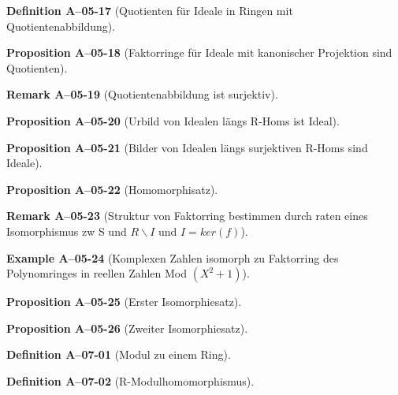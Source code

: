 \documentclass[10pt, letterpaper]{article}
\newcommand{\CustomHeading}[3]{%
  \par\medskip\noindent%
  \textbf{#1 #2} \textnormal{(#3)}.\enskip%
}
\newenvironment{DEF}[2]{\CustomHeading{Definition}{#1}{#2}}{}
\newenvironment{PROP}[2]{\CustomHeading{Proposition}{#1}{#2}}{}
\newenvironment{REM}[2]{\CustomHeading{Remark}{#1}{#2}}{}
\newenvironment{EXA}[2]{\CustomHeading{Example}{#1}{#2}}{}
\begin{document}
\begin{DEF}{A--05-17}{Quotienten für Ideale in Ringen mit Quotientenabbildung}
\end{DEF}

\begin{PROP}{A--05-18}{Faktorringe für Ideale mit kanonischer Projektion sind Quotienten}
\end{PROP}

\begin{REM}{A--05-19}{Quotientenabbildung ist surjektiv}
\end{REM}

\begin{PROP}{A--05-20}{Urbild von Idealen längs R-Homs ist Ideal}
\end{PROP}

\begin{PROP}{A--05-21}{Bilder von Idealen längs surjektiven R-Homs sind Ideale}
\end{PROP}

\begin{PROP}{A--05-22}{Homomorphisatz}
\end{PROP}

\begin{REM}{A--05-23}{Struktur von Faktorring bestimmen durch raten eines Isomorphismus zw S und $R\backslash I$ und $I=ker(f)$}
\end{REM}

\begin{EXA}{A--05-24}{Komplexen Zahlen isomorph zu Faktorring des Polynomringes in reellen Zahlen Mod $(X^2+1)$}
\end{EXA}

\begin{PROP}{A--05-25}{Erster Isomorphiesatz}
\end{PROP}

\begin{PROP}{A--05-26}{Zweiter Isomorphiesatz}
\end{PROP}

\begin{DEF}{A--07-01}{Modul zu einem Ring}
\end{DEF}

\begin{DEF}{A--07-02}{R-Modulhomomorphismus}
\end{DEF}
\end{document}
